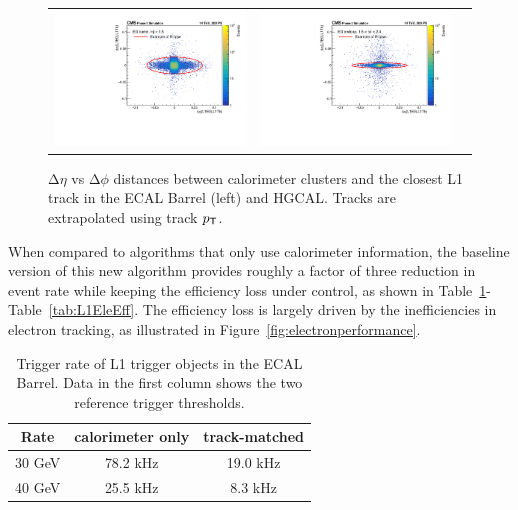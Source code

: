  \begin{figure}[tbh!]
 \begin{center}
 \begin{tabular}{ccc}
  \includegraphics[width=.45\linewidth]{figures/Part2/Upgrade/DR_barrel}&
  \includegraphics[width=.45\linewidth]{figures/Part2/Upgrade/DR_endcap}&
 \end{tabular}
 \caption{$\mathrm{\Delta}\eta$ vs $\mathrm{\Delta}\phi$ distances between calorimeter clusters and the closest \ac{L1} track in the \ac{ECAL} Barrel (left) and \ac{HGCAL}. Tracks are extrapolated using track $p_{\textsf{T}}$.}
 \label{fig:electron}
 \end{center}
\end{figure}

When compared to algorithms that only use calorimeter information, the baseline version of this new algorithm provides roughly a factor of three reduction in event rate while keeping the efficiency loss under control, as shown in Table~\ref{tab:L1EleRate}-Table~\ref{tab:L1EleEff}. The efficiency loss is largely driven by the inefficiencies in electron tracking, as illustrated in Figure~\ref{fig:electronperformance}.

\begin{table}[th]
\sffamily
\centering
\caption{Trigger rate of \ac{L1} trigger objects in the \ac{ECAL} Barrel. Data in the first column shows the two reference trigger thresholds.}
\begin{tabular}{ccc} \toprule
Rate & calorimeter only & track-matched \\  \midrule
 30 GeV   & 78.2 kHz   & 19.0 kHz\\ \midrule
 40 GeV & 25.5 kHz   & 8.3 kHz\\ \bottomrule
\end{tabular}
\label{tab:L1EleRate}
\end{table}

